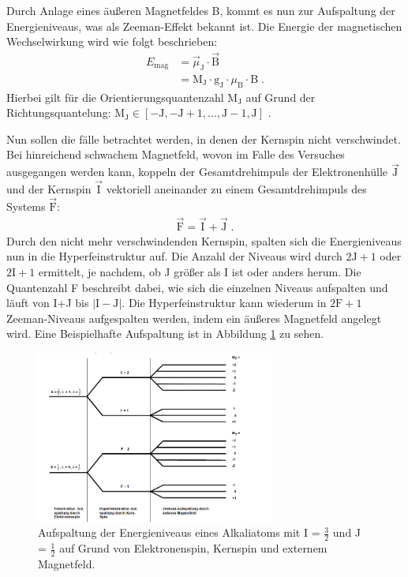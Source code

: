 Durch Anlage eines äußeren Magnetfeldes B, kommt es nun zur Aufspaltung der Energieniveaus, was als Zeeman-Effekt bekannt ist. Die Energie der magnetischen Wechselwirkung wird wie folgt beschrieben:
\begin{align}
    E_{\text{mag}} &= \vec{\mu}_{\text{J}} \cdot \vec{\text{B}} \\
    &= \text{M}_\text{J} \cdot \text{g}_\text{J} \cdot \mu_{\text{B}} \cdot \text{B} \; .
    \label{eq:E_mag}
\end{align}
Hierbei gilt für die Orientierungsquantenzahl $\text{M}_\text{J}$ auf Grund der Richtungsquantelung: $\text{M}_{\text{J}} \in [-\text{J}, -\text{J}+1,\hdots,\text{J}-1,\text{J}]$ .

\noindent Nun sollen die fälle betrachtet werden, in denen der Kernspin nicht verschwindet.
Bei hinreichend schwachem Magnetfeld, wovon im Falle des Versuches ausgegangen werden kann, koppeln der Gesamtdrehimpuls der Elektronenhülle $\vec{\text{J}}$ und der Kernspin $\vec{\text{I}}$ vektoriell aneinander zu einem Gesamtdrehimpuls des Systems $\vec{\text{F}}$:
\begin{align*}
    \vec{\text{F}} = \vec{\text{I}} + \vec{\text{J}} \; .
\end{align*}
Durch den nicht mehr verschwindenden Kernspin, spalten sich die Energieniveaus nun in die Hyperfeinstruktur auf.
Die Anzahl der Niveaus wird durch $2\text{J}+1$ oder $2\text{I}+1$ ermittelt, je nachdem, ob J größer als I ist oder anders herum.
Die Quantenzahl F beschreibt dabei, wie sich die einzelnen Niveaus aufspalten und läuft von I+J bis $|\text{I}-\text{J}|$.
Die Hyperfeinstruktur kann wiederum in $2\text{F}+1$ Zeeman-Niveaus aufgespalten werden, indem ein äußeres Magnetfeld angelegt wird.
Eine Beispielhafte Aufspaltung ist in Abbildung \ref{abb:Aufspaltung} zu sehen.
\FloatBarrier
\begin{figure}
    \centering
    \includegraphics[width=0.7\textwidth]{Aufspaltung.PNG}
    \caption{Aufspaltung der Energieniveaus eines Alkaliatoms mit I = $\frac{3}{2}$ und J = $\frac{1}{2}$ auf Grund von Elektronenspin, Kernspin und externem Magnetfeld. \cite{Q1}}
    \label{abb:Aufspaltung}
\end{figure}
